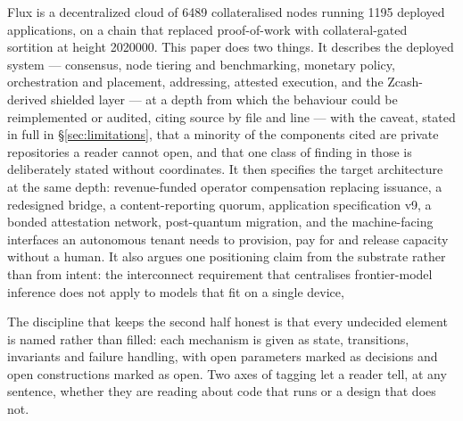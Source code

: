 Flux is a decentralized cloud of \num{6489} collateralised nodes running \num{1195} deployed
applications, on a chain that replaced proof-of-work with collateral-gated sortition at height
\num{2020000}. This paper does two things. It describes the deployed system --- consensus, node
tiering and benchmarking, monetary policy, orchestration and placement, addressing, attested
execution, and the Zcash-derived shielded layer --- at a depth from which the behaviour could be
reimplemented or audited, citing source by file and line --- with the caveat, stated in full in
\S\ref{sec:limitations}, that a minority of the components cited are private repositories a reader
cannot open, and that one class of finding in those is deliberately stated without coordinates. It then specifies the target architecture
at the same depth: revenue-funded operator compensation replacing issuance, a redesigned bridge,
a content-reporting quorum, application specification v9, a bonded attestation network,
post-quantum migration, and the machine-facing interfaces an autonomous tenant needs to provision,
pay for and release capacity without a human. It also argues one positioning claim from the
substrate rather than from intent: the interconnect requirement that centralises frontier-model
inference does not apply to models that fit on a single device, 

The discipline that keeps the second half honest is that every undecided element is named rather
than filled: each mechanism is given as state, transitions, invariants and failure handling, with
open parameters marked as decisions and open constructions marked as open. Two axes of tagging let a
reader tell, at any sentence, whether they are reading about code that runs or a design that does
not.

